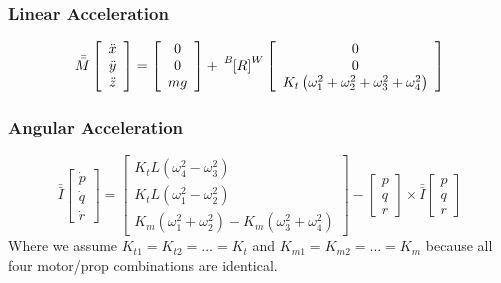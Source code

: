 \documentclass{article}
\numberwithin{equation}{section}
\newcommand{\BtoW}{
\tensor[^B]{\left[R\right]}{^W}
}
\newcommand{\omegaVec}{
\left[ \begin{array}{ccc}
p\\
q\\
r \end{array} \right]
}
\begin{document}
\subsubsection{Linear Acceleration}
\begin{equation}
    \label{linAccelMot}
     \bar{\bar{M}} \left[ \begin{array}{ccc} 
           \ddot{x} \\ 
           \ddot{y} \\ 
           \ddot{z} \end{array} \right] 
           =
   \left[ \begin{array}{ccc}
          0 \\
          0 \\
          mg \end{array} \right]
          +
    \BtoW \left[\begin{array}{ccc}
         0 \\
         0 \\
         K_t\left(\omega_1^2 + \omega_2^2 + \omega_3^2 + \omega_4^2\right)
         \end{array}\right]
\end{equation}

\subsubsection{Angular Acceleration}
\begin{equation}
  \label{angAccelMot}
  \bar{\bar{I}} \left[ \begin{array}{ccc} \dot{p} \\ 
  							\dot{q} \\ 
							\dot{r} \end{array} \right]
  =
  \left[ \begin{array}{ccc} K_{t}L\left(\omega_4^2 - \omega_3^2\right) \\ 
  				      K_{t}L\left(\omega_1^2 - \omega_2^2\right) \\ 
				      K_{m}\left(\omega_1^2 + \omega_2^2\right) - K_{m}\left(\omega_3^2 +\omega_4^2\right) \end{array} \right]
				      -
				      \omegaVec \times \bar{\bar{I}} \omegaVec
  \end{equation}
 Where we assume $K_{t1} = K_{t2} = ... = K_{t}$ and $K_{m1} = K_{m2} = ... = K_{m}$ because all four motor/prop combinations are identical.
\end{document}
